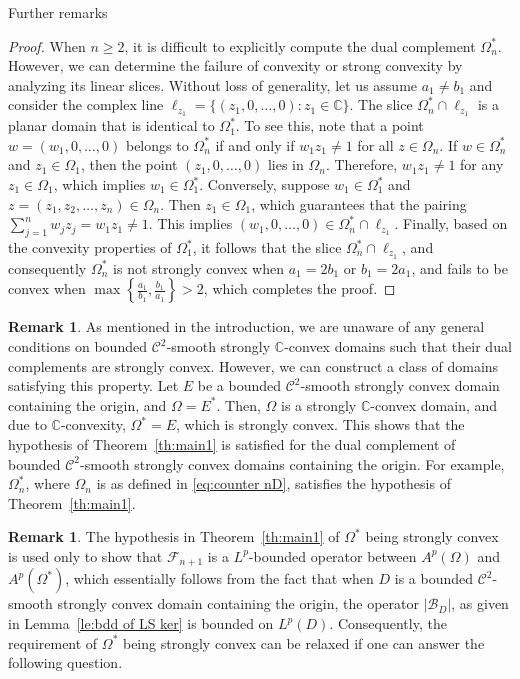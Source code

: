 \documentclass[11pt, oneside, reqno]{amsart}
\numberwithin{equation}{section}
\theoremstyle{definition}
\newtheorem{remark}[theorem]{Remark}
\newcommand{\cont}{\mathcal C}
\newcommand{\C}{\mathbb C}
\newcommand{\Om}{\Omega}
\begin{document}
{\begin{section}{Further remarks}
\begin{proof}
When $n\geq2$, it is difficult to explicitly compute the dual complement $\Om_n^*$. However, we can determine the failure of convexity or strong convexity by analyzing its linear slices. Without loss of generality, let us assume $a_1\neq b_1$ and consider the complex line $\ell_{z_1} =\{ (z_1, 0, \dots, 0) : z_1 \in \C\}$. The slice $\Om_n^*\cap \ell_{z_1}$ is a planar domain that is identical to $\Om_1^*$. To see this, note that a point $w = (w_1, 0, \dots, 0)$ belongs to $\Om_n^*$ if and only if $w_1 z_1 \neq 1$ for all $z \in \Om_n$. If $w \in \Om_n^*$ and $z_1 \in \Om_1$, then the point $(z_1, 0, \dots, 0)$ lies in $\Om_n$. Therefore, $w_1 z_1 \neq 1$ for any $z_1 \in \Om_1$, which implies $w_1 \in \Om_1^*$. Conversely, suppose $w_1 \in \Om_1^*$ and $z = (z_1, z_2,\dots,z_n) \in\Om_n$. Then $z_1\in\Om_1$, which guarantees that the pairing $\sum_{j=1}^n w_j z_j = w_1 z_1 \neq 1$. This implies $(w_1, 0, \dots, 0) \in \Om_n^* \cap \ell_{z_1}$.
Finally, based on the convexity properties of $\Om_1^*$, it follows that the slice $\Om_n^* \cap \ell_{z_1}$, and consequently $\Om_n^*$ is not strongly convex when $a_1 = 2b_1$ or $b_1 = 2a_1$, and fails to be convex when $\max\left\{\frac{a_1}{b_1}, \frac{b_1}{a_1}\right\}>2$, which completes the proof.
 \end{proof}
\begin{remark}\label{rk:thm 1 2}
As mentioned in the introduction, we are unaware of any general conditions on bounded $\cont^2$-smooth strongly $\C$-convex domains such that their dual complements are strongly convex. However, we can construct a class of domains satisfying this property. Let $E$ be a bounded $\cont^2$-smooth strongly convex domain containing the origin, and $\Om= E^*$. Then, $\Om$ is a strongly $\C$-convex domain, and due to $\C$-convexity, $\Om^*= E$, which is strongly convex. This shows that the hypothesis of Theorem~\ref{th:main1} is satisfied for the dual complement of bounded $\cont^2$-smooth strongly convex domains containing the origin. For example, $\Om_n^*$, where $\Om_n$ is as defined in \eqref{eq:counter nD}, satisfies the hypothesis of Theorem~\ref{th:main1}.
\end{remark}
\begin{remark}\label{rk:ques L^p bdd}
    The hypothesis in Theorem~\ref{th:main1} of $\Om^*$ being strongly convex is used only to show that $\mathcal F_{n+1}$ is a $L^p$-bounded operator between $A^p(\Om)$ and $A^p(\Om^*)$, which essentially follows from the fact that when $D$ is a bounded $\cont^2$-smooth strongly convex domain containing the origin, the operator $|\mathcal B_{D}|$, as given in Lemma~\ref{le:bdd of LS ker} is bounded on $L^p(D)$. Consequently, the requirement of $\Om^*$ being strongly convex can be relaxed if one can answer the following question.
    

\end{remark}
\end{section}}
\end{document}
